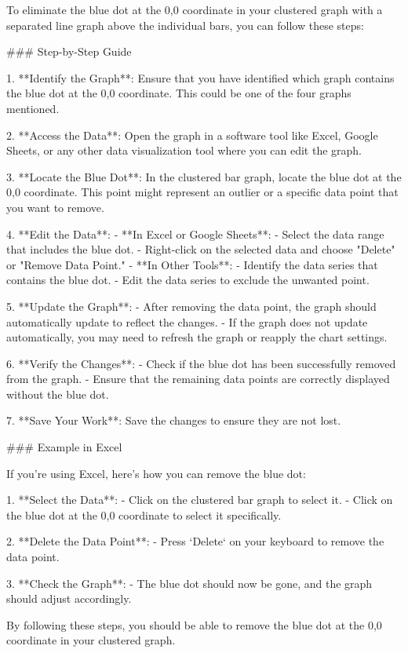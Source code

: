 To eliminate the blue dot at the 0,0 coordinate in your clustered graph with a separated line graph above the individual bars, you can follow these steps:

### Step-by-Step Guide

1. **Identify the Graph**: Ensure that you have identified which graph contains the blue dot at the 0,0 coordinate. This could be one of the four graphs mentioned.

2. **Access the Data**: Open the graph in a software tool like Excel, Google Sheets, or any other data visualization tool where you can edit the graph.

3. **Locate the Blue Dot**: In the clustered bar graph, locate the blue dot at the 0,0 coordinate. This point might represent an outlier or a specific data point that you want to remove.

4. **Edit the Data**:
   - **In Excel or Google Sheets**: 
     - Select the data range that includes the blue dot.
     - Right-click on the selected data and choose "Delete" or "Remove Data Point."
   - **In Other Tools**:
     - Identify the data series that contains the blue dot.
     - Edit the data series to exclude the unwanted point.

5. **Update the Graph**:
   - After removing the data point, the graph should automatically update to reflect the changes.
   - If the graph does not update automatically, you may need to refresh the graph or reapply the chart settings.

6. **Verify the Changes**:
   - Check if the blue dot has been successfully removed from the graph.
   - Ensure that the remaining data points are correctly displayed without the blue dot.

7. **Save Your Work**: Save the changes to ensure they are not lost.

### Example in Excel

If you're using Excel, here's how you can remove the blue dot:

1. **Select the Data**:
   - Click on the clustered bar graph to select it.
   - Click on the blue dot at the 0,0 coordinate to select it specifically.

2. **Delete the Data Point**:
   - Press `Delete` on your keyboard to remove the data point.

3. **Check the Graph**:
   - The blue dot should now be gone, and the graph should adjust accordingly.

By following these steps, you should be able to remove the blue dot at the 0,0 coordinate in your clustered graph.